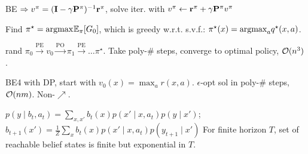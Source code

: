 \begin{definition}
    BE \(\Rightarrow v^\pi = (\vb{I} - \gamma \vb{P}^\pi)^{-1}\vb{r}^\pi\), solve iter. with \(v^\pi \leftarrow \vb{r}^\pi + \gamma \vb{P}^\pi v^\pi\)
\end{definition}

\begin{definition}
    Find \(\pi^\star = \text{argmax}_{}\mathbb{E}_{\pi}[G_0]\), which is greedy w.r.t. s.v.f.: \(\pi^\star(x) = \text{argmax}_{a} q^\star(x, a)\).
\end{definition}

\begin{definition}[PI]
    rand \(\pi_0 \overset{\text{PE}}{\to} v_0 \overset{\text{PO}}{\to} \pi_1 \overset{\text{PE}}{\to} \ldots \pi^\star\). Take poly-\# steps, converge to optimal policy, \(\mathcal{O}(n^3)\).
\end{definition}

\begin{definition}[VI]
    BE4 with DP, start with \(v_0(x) = \max_a r(x, a)\).
    \(\epsilon\)-opt sol in poly-\# steps, \(\mathcal{O}(nm)\). Non-\(\nearrow\).
\end{definition}

\begin{definition}[POMDP]
    \(p(y \mid b_t, a_t) = \sum_{x, x'}b_t(x) p(x' \mid x, a_t)p(y \mid x')\);
    \(b_{t+1}(x') = \frac{1}{Z} \sum_x b_t(x)p(x' \mid x, a_t)p(y_{t+1} \mid x')\)
    For finite horizon \(T\), set of reachable belief states is finite but exponential in \(T\).
\end{definition}